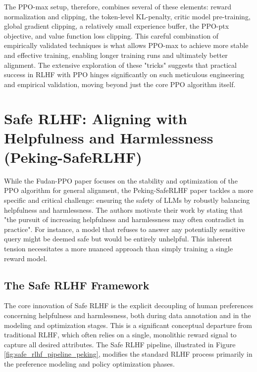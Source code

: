 \documentclass[10pt,journal,compsoc]{IEEEtran} %
\begin{document}
The PPO-max setup, therefore, combines several of these elements: reward normalization and clipping, the token-level KL-penalty, critic model pre-training, global gradient clipping, a relatively small experience buffer, the PPO-ptx objective, and value function loss clipping. \cite{Zheng2023PPO} This careful combination of empirically validated techniques is what allows PPO-max to achieve more stable and effective training, enabling longer training runs and ultimately better alignment. The extensive exploration of these "tricks" suggests that practical success in RLHF with PPO hinges significantly on such meticulous engineering and empirical validation, moving beyond just the core PPO algorithm itself.

\section{Safe RLHF: Aligning with Helpfulness and Harmlessness (Peking-SafeRLHF)}
\label{sec:peking_safe_rlhf}

While the Fudan-PPO paper focuses on the stability and optimization of the PPO algorithm for general alignment, the Peking-SafeRLHF paper \cite{Dai2023SafeRLHF} tackles a more specific and critical challenge: ensuring the safety of LLMs by robustly balancing helpfulness and harmlessness. The authors motivate their work by stating that "the pursuit of increasing helpfulness and harmlessness may often contradict in practice". \cite{Dai2023SafeRLHF} For instance, a model that refuses to answer any potentially sensitive query might be deemed safe but would be entirely unhelpful. This inherent tension necessitates a more nuanced approach than simply training a single reward model.

\subsection{The Safe RLHF Framework}
The core innovation of Safe RLHF is the explicit decoupling of human preferences concerning helpfulness and harmlessness, both during data annotation and in the modeling and optimization stages. \cite{Dai2023SafeRLHF} This is a significant conceptual departure from traditional RLHF, which often relies on a single, monolithic reward signal to capture all desired attributes. The Safe RLHF pipeline, illustrated in Figure \ref{fig:safe_rlhf_pipeline_peking}, modifies the standard RLHF process primarily in the preference modeling and policy optimization phases.

\end{document}
